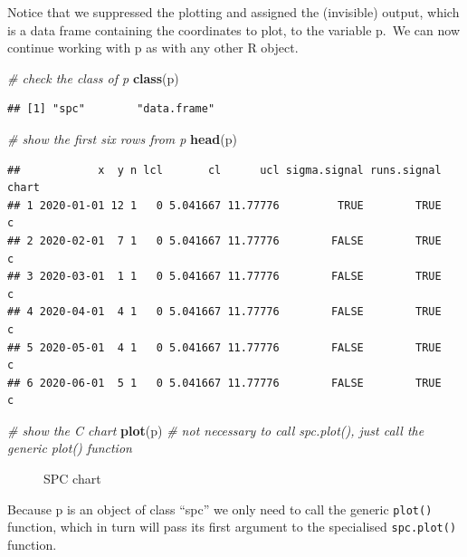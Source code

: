 \documentclass[
]{book}
\makeatletter
\newenvironment{Shaded}{\begin{snugshade}}{\end{snugshade}}
\newcommand{\CommentTok}[1]{\textcolor[rgb]{0.56,0.35,0.01}{\textit{#1}}}
\newcommand{\FunctionTok}[1]{\textcolor[rgb]{0.13,0.29,0.53}{\textbf{#1}}}
\newcommand{\NormalTok}[1]{#1}
\newcommand*\pandocbounded[1]{%
  \sbox\pandoc@box{#1}%
  \Gscale@div\@tempa{\textheight}{\dimexpr\ht\pandoc@box+\dp\pandoc@box\relax}%
  \Gscale@div\@tempb{\linewidth}{\wd\pandoc@box}%
  \ifdim\@tempb\p@<\@tempa\p@\let\@tempa\@tempb\fi%
  \ifdim\@tempa\p@<\p@\scalebox{\@tempa}{\usebox\pandoc@box}%
  \else\usebox{\pandoc@box}%
  \fi%
}
\makeatother
\begin{document}
Notice that we suppressed the plotting and assigned the (invisible) output, which is a data frame containing the coordinates to plot, to the variable p.~We can now continue working with p as with any other R object.

\begin{Shaded}
\begin{Highlighting}[]
\CommentTok{\# check the class of p}
\FunctionTok{class}\NormalTok{(p)}
\end{Highlighting}
\end{Shaded}

\begin{verbatim}
## [1] "spc"        "data.frame"
\end{verbatim}

\begin{Shaded}
\begin{Highlighting}[]
\CommentTok{\# show the first six rows from p}
\FunctionTok{head}\NormalTok{(p)}
\end{Highlighting}
\end{Shaded}

\begin{verbatim}
##            x  y n lcl       cl      ucl sigma.signal runs.signal chart
## 1 2020-01-01 12 1   0 5.041667 11.77776         TRUE        TRUE     c
## 2 2020-02-01  7 1   0 5.041667 11.77776        FALSE        TRUE     c
## 3 2020-03-01  1 1   0 5.041667 11.77776        FALSE        TRUE     c
## 4 2020-04-01  4 1   0 5.041667 11.77776        FALSE        TRUE     c
## 5 2020-05-01  4 1   0 5.041667 11.77776        FALSE        TRUE     c
## 6 2020-06-01  5 1   0 5.041667 11.77776        FALSE        TRUE     c
\end{verbatim}

\begin{Shaded}
\begin{Highlighting}[]
\CommentTok{\# show the C chart}
\FunctionTok{plot}\NormalTok{(p) }\CommentTok{\# not necessary to call spc.plot(), just call the generic plot() function}
\end{Highlighting}
\end{Shaded}

\begin{figure}
\centering
\pandocbounded{}
\caption{\label{fig:ggplot-fig1}SPC chart}
\end{figure}

Because p is an object of class ``spc'' we only need to call the generic \texttt{plot()} function, which in turn will pass its first argument to the specialised \texttt{spc.plot()} function.
\end{document}
